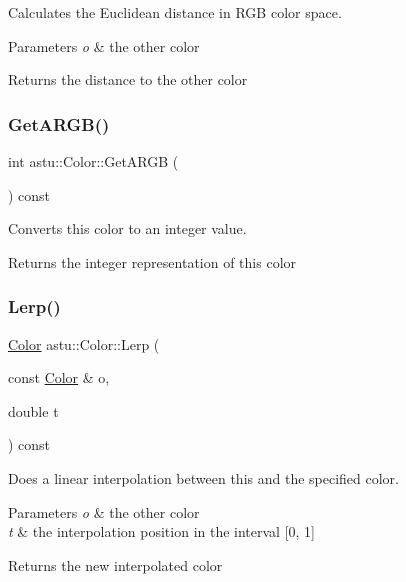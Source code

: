 Calculates the Euclidean distance in R\+GB color space.


\begin{DoxyParams}{Parameters}
{\em o} & the other color \\
\hline
\end{DoxyParams}
\begin{DoxyReturn}{Returns}
the distance to the other color 
\end{DoxyReturn}
\mbox{\label{classastu_1_1Color_a6e8ee28f89245f4e8d96c8c62144854f}} 
\subsubsection{\texorpdfstring{Get\+A\+R\+G\+B()}{GetARGB()}}
{\footnotesize\ttfamily int astu\+::\+Color\+::\+Get\+A\+R\+GB (\begin{DoxyParamCaption}{ }\end{DoxyParamCaption}) const}

Converts this color to an integer value.

\begin{DoxyReturn}{Returns}
the integer representation of this color 
\end{DoxyReturn}
\mbox{\label{classastu_1_1Color_a0dc0303a14adf0712e12e756bde1b365}} 
\subsubsection{\texorpdfstring{Lerp()}{Lerp()}}
{\footnotesize\ttfamily \hyperlink{classastu_1_1Color}{Color} astu\+::\+Color\+::\+Lerp (\begin{DoxyParamCaption}\item[{const \hyperlink{classastu_1_1Color}{Color} \&}]{o,  }\item[{double}]{t }\end{DoxyParamCaption}) const}

Does a linear interpolation between this and the specified color.


\begin{DoxyParams}{Parameters}
{\em o} & the other color \\
\hline
{\em t} & the interpolation position in the interval \mbox{[}0, 1\mbox{]} \\
\hline
\end{DoxyParams}
\begin{DoxyReturn}{Returns}
the new interpolated color 
\end{DoxyReturn}
\mbox{\label{classastu_1_1Color_ad55ea16978ae52e3feb77109865921bd}} 
